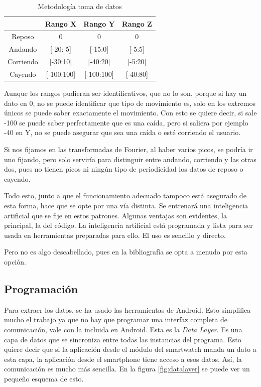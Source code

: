 \documentclass[12pt]{article}
\numberwithin{equation}{section}
\begin{document}
\begin{center}
\begin{table}
\caption{Metodología toma de datos}
\begin{center}
\begin{tabular}{| c | c | c | c |}
\hline
 & Rango X & Rango Y & Rango Z \\
\hline
Reposo & 0 & 0 & 0\\
\hline
Andando & [-20:-5] & [-15:0] & [-5:5] \\
\hline
Corriendo & [-30:10] & [-40:20] & [-5:20] \\
\hline
Cayendo & [-100:100] & [-100:100] & [-40:80] \\
\hline
\end{tabular}
\end{center}
\label{table1}
\end{table}
\end{center}


Aunque los rangos pudieran ser identificativos, que no lo son, porque si hay un dato en 0, no se puede identificar que tipo de movimiento es, solo en los extremos únicos se puede saber exactamente el movimiento. Con esto se quiere decir, si sale -100 se puede saber perfectamente que es una caída, pero si saliera por ejemplo -40 en Y, no se puede asegurar que sea una caída o esté corriendo el usuario.

Si nos fijamos en las transformadas de Fourier, al haber varios picos,  se podría ir uno fijando, pero solo serviría para distinguir entre andando, corriendo y las otras dos, pues no tienen picos ni ningún tipo de periodicidad los datos de reposo o cayendo. 

Todo esto, junto a que el funcionamiento adecuado tampoco está asegurado de esta forma, hace que se opte por una vía distinta. Se entrenará una inteligencia artificial que se fije en estos patrones. Algunas ventajas son evidentes, la principal, la del código. La inteligencia artificial está programada y lista para ser usada en herramientas preparadas para ello. El uso es sencillo y directo.

Pero no es algo descabellado, pues en la bibliografía\cite{s150818901} se opta a menudo por esta opción.


\newpage

\newpage
\subsection{Programación}

Para extraer los datos, se ha usado las herramientas de Android. Esto simplifica mucho el trabajo ya que no hay que programar una interfaz completa de comunicación, vale con la incluida en Android. Esta es la \textit{Data Layer}. Es una capa de datos que se sincroniza entre todas las instancias del programa. Esto quiere decir que si la aplicación desde el módulo del smartwatch manda un dato a esta capa, la aplicación desde el smartphone tiene acceso a esos datos. Así, la comunicación es mucho más sencilla. En la figura \ref{fig:datalayer} se puede ver un pequeño esquema de esto.
\end{document}
